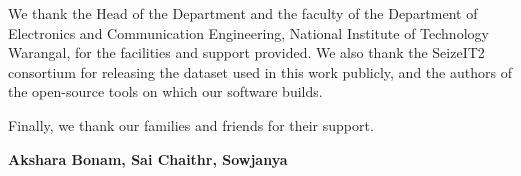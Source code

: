 \documentclass[12pt,a4paper,oneside]{report}
\newcommand{\studentA}{Akshara Bonam}
\newcommand{\studentB}{Sai Chaithr}
\newcommand{\studentC}{Sowjanya}
\newcommand{\dept}{Electronics and Communication Engineering}
\begin{document}
We thank the Head of the Department and the faculty of the Department of \dept, National Institute of Technology
Warangal, for the facilities and support provided. We also thank the SeizeIT2 consortium for releasing the dataset
used in this work publicly, and the authors of the open-source tools on which our software builds.

Finally, we thank our families and friends for their support.

\vspace{10mm}
\hfill\textbf{\studentA, \studentB, \studentC}



\cleardoublepage
{}
{}
\tableofcontents
\cleardoublepage
{}
{}
\listoffigures
\cleardoublepage
{}
{}
\listoftables


\cleardoublepage
{}









\cleardoublepage
{}
{}
\renewcommand{\bibname}{References}
{\small\singlespacing

}

\appendix

\end{document}
